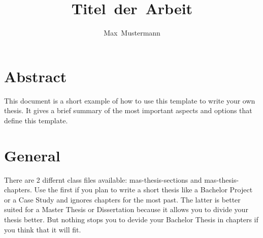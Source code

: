 \documentclass[masterarbeit,grey]{mas-thesis-sections}				%
\author{Max~Mustermann}						%
\title{Titel~der~Arbeit}
\begin{document}
\maketitle				%

\cleardoublepage

\eidesstattlicheErklaerung

\tableofcontents		%

\cleardoublepage

\listofillustrations	%


\cleardoublepage

\setcounter{page}{1}


% 
% 
% 
% 
% 
% 


\section{Abstract}

This document is a short example of how to use this template to write your own thesis. It gives a brief summary of the most important aspects and options that define this template.

\newpage


\section{General}

There are 2 differnt class files available: mas-thesis-sections and mas-thesis-chapters. Use the first if you plan to write a short thesis like a Bachelor Project or a Case Study and ignores chapters for the most past. The latter is better suited for a Master Thesis or Dissertation because it allows you to divide your thesis better. But nothing stops you to devide your Bachelor Thesis in chapters if you think that it will fit.
\end{document}
